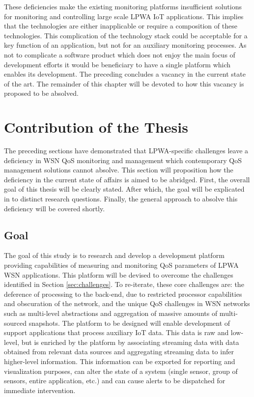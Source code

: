 These deficiencies make the existing monitoring platforms insufficient solutions for monitoring and controlling large scale LPWA IoT applications. This implies that the technologies are either inapplicable or require a composition of these technologies. This complication of the technology stack could be acceptable for a key function of an application, but not for an auxiliary monitoring processes. As not to complicate a software product which does not enjoy the main focus of development efforts it would be beneficiary to have a single platform which enables its development. The preceding concludes a vacancy in the current state of the art. The remainder of this chapter will be devoted to how this vacancy is proposed to be absolved.

\section{Contribution of the Thesis}
The preceding sections have demonstrated that LPWA-specific challenges leave a deficiency in WSN QoS monitoring and management which contemporary QoS management solutions cannot absolve. This section will proposition how the deficiency in the current state of affairs is aimed to be abridged. First, the overall goal of this thesis will be clearly stated. After which, the goal will be explicated in to distinct research questions. Finally, the general approach to absolve this deficiency will be covered shortly.
\subsection{Goal}
\label{sec:goal}
The goal of this study is to research and develop a development platform providing capabilities of measuring and monitoring QoS parameters of LPWA WSN applications. This platform will be devised to overcome the challenges identified in Section \ref{sec:challenges}. To re-iterate, these core challenges are: the deference of processing to the back-end, due to restricted processor capabilities and obscuration of the network, and the unique QoS challenges in WSN networks such as multi-level abstractions and aggregation of massive amounts of multi-sourced snapshots. The platform to be designed will enable development of support applications that process auxiliary IoT data. This data is raw and low-level, but is enriched by the platform by associating streaming data with data obtained from relevant data sources and aggregating streaming data to infer higher-level information. This information can be exported for reporting and visualization purposes, can alter the state of a system (single sensor, group of sensors, entire application, etc.) and can cause alerts to be dispatched for immediate intervention.

